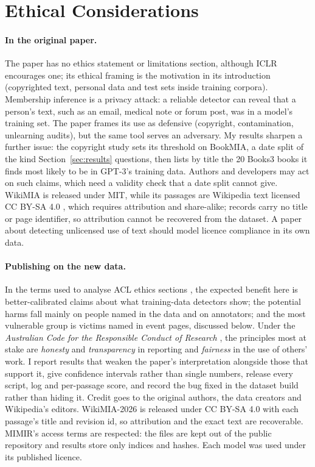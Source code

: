 \documentclass[11pt]{article}
\begin{document}
\section{Ethical Considerations}
\label{sec:ethics}

\paragraph{In the original paper.} The paper has no ethics statement or limitations section, although ICLR encourages one; its ethical framing is the motivation in its introduction (copyrighted text, personal data and test sets inside training corpora). Membership inference is a privacy attack: a reliable detector can reveal that a person's text, such as an email, medical note or forum post, was in a model's training set. The paper frames its use as defensive (copyright, contamination, unlearning audits), but the same tool serves an adversary. My results sharpen a further issue: the copyright study sets its threshold on BookMIA, a date split of the kind Section~\ref{sec:results} questions, then lists by title the 20 Books3 books it finds most likely to be in GPT-3's training data. Authors and developers may act on such claims, which need a validity check that a date split cannot give. WikiMIA is released under MIT, while its passages are Wikipedia text licensed CC BY-SA 4.0 \citep{wikipediacopyright}, which requires attribution and share-alike; records carry no title or page identifier, so attribution cannot be recovered from the dataset. A paper about detecting unlicensed use of text should model licence compliance in its own data.

\paragraph{Publishing on the new data.} In the terms used to analyse ACL ethics sections \citep{benotti2022ethics,karamolegkou2025ethical}, the expected benefit here is better-calibrated claims about what training-data detectors show; the potential harms fall mainly on people named in the data and on annotators; and the most vulnerable group is victims named in event pages, discussed below. Under the \emph{Australian Code for the Responsible Conduct of Research} \citep{acrcr2018}, the principles most at stake are \emph{honesty} and \emph{transparency} in reporting and \emph{fairness} in the use of others' work. I report results that weaken the paper's interpretation alongside those that support it, give confidence intervals rather than single numbers, release every script, log and per-passage score, and record the bug fixed in the dataset build rather than hiding it. Credit goes to the original authors, the data creators and Wikipedia's editors. WikiMIA-2026 is released under CC BY-SA 4.0 with each passage's title and revision id, so attribution and the exact text are recoverable. MIMIR's access terms are respected: the files are kept out of the public repository and results store only indices and hashes. Each model was used under its published licence.
\end{document}
